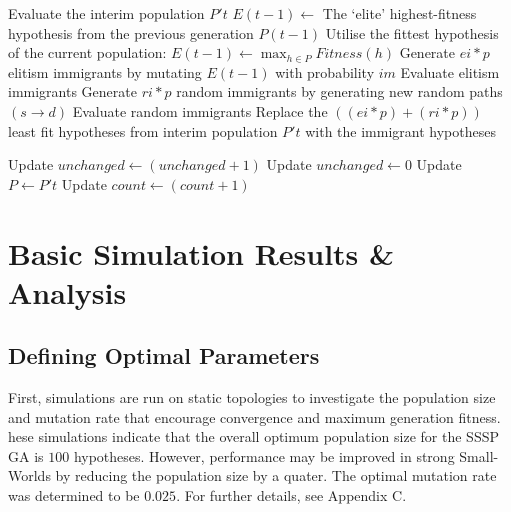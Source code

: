 \documentclass[
	a4paper, %
	10pt, %
	unnumberedsections, %
	twoside, %
]{LTJournalArticle}
\begin{document}
\begin{algorithm}[H]
	\begin{algorithmic}[30]
					\State Evaluate the interim population $P't$
					\State $E(t-1) \leftarrow$ The `elite' highest-fitness hypothesis from the previous generation $P(t-1)$ 
							\State Utilise the fittest hypothesis of the current population: 
							\State $E(t - 1) \leftarrow \max_{h \in P} Fitness(h)$ 
						\EndIf
						\State Generate $ei * p$ elitism immigrants by mutating $E(t-1)$ with probability $im$ 
						\State Evaluate elitism immigrants 
					\EndIf
						\State Generate $ri * p$ random immigrants by generating new random paths \((s \rightarrow d)\) 
						\State Evaluate random immigrants 
					\EndIf
					\State Replace the $((ei * p) + (ri * p))$ least fit hypotheses from interim population $P't$ with the immigrant hypotheses 
					
						\State Update $unchanged \leftarrow (unchanged + 1)$
					\Else 
						\State Update $unchanged \leftarrow 0$ 
					\EndIf
					\State Update $P \leftarrow P't$
					\State Update $count \leftarrow (count + 1)$ 		
	\end{algorithmic}
	\label{alg:higa} 
\end{algorithm}

\section{Basic Simulation Results \& Analysis} 

\subsection{Defining Optimal Parameters} 

First, simulations are run on static topologies to investigate the population size and mutation rate that encourage convergence and maximum generation fitness. hese simulations indicate that the overall optimum population size for the SSSP GA is \(100\) hypotheses. However, performance may be improved in strong Small-Worlds by reducing the population size by a quater. The optimal mutation rate was determined to be \(0.025\). For further details, see Appendix C. 
\end{document}
